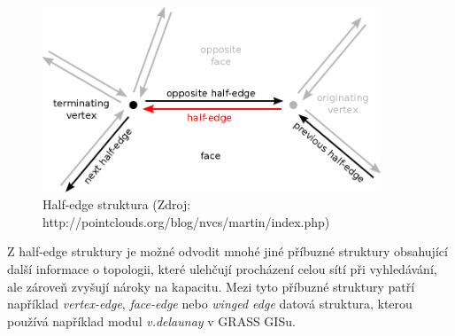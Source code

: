 \documentclass[12pt,a4paper]{article}
\begin{document}
\begin{figure}[h!]
\centering
\includegraphics[width=0.9\textwidth]{img/half_edge.png}
\caption{Half-edge struktura (Zdroj: http://pointclouds.org/blog/nvcs/martin/index.php)}
\label{fig:half_edge}
\end{figure}

Z half-edge struktury je možné odvodit mnohé jiné příbuzné struktury obsahující další informace o topologii, které ulehčují procházení celou sítí při vyhledávání, ale zároveň zvyšují nároky na kapacitu. Mezi tyto příbuzné struktury patří například \emph{vertex-edge}, \emph{face-edge} nebo \emph{winged edge} datová struktura, kterou používá například modul \emph{v.delaunay} v GRASS GISu.
\end{document}

